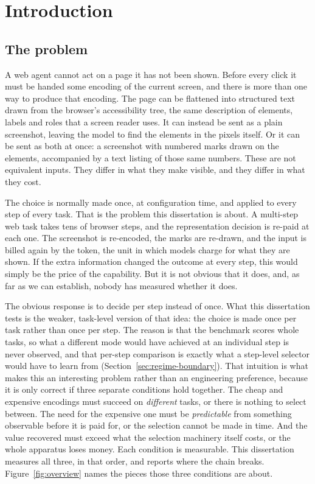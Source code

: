 \chapter{Introduction}
\label{ch:intro}

\section{The problem}
\label{sec:problem}

A web agent cannot act on a page it has not been shown. Before every click it
must be handed some encoding of the current screen, and there is more than one
way to produce that encoding. The page can be flattened into structured text
drawn from the browser's accessibility tree, the same description of elements,
labels and roles that a screen reader uses. It can instead be sent as a plain
screenshot, leaving the model to find the elements in the pixels itself. Or it
can be sent as both at once: a screenshot with numbered marks drawn on the
elements, accompanied by a text listing of those same numbers. These are
not equivalent inputs. They differ in what they make visible, and they differ in
what they cost.

The choice is normally made once, at configuration time, and applied to every
step of every task. That is the problem this dissertation is about. A
multi-step web task takes tens of browser steps, and the representation
decision is re-paid at each one. The screenshot is re-encoded, the marks are
re-drawn, and the input is billed again by the token, the unit in which
models charge for what they are shown. If the extra information changed the outcome at every
step, this would simply be the price of the capability. But it is not obvious
that it does, and, as far as we can establish, nobody has measured whether it does.

The obvious response is to decide per step instead of once. What this
dissertation tests is the weaker, task-level version of that idea: the choice
is made once per task rather than once per step. The reason is that the
benchmark scores whole tasks, so what a different mode would have achieved at
an individual step is never observed, and that per-step comparison is
exactly what a step-level selector would have to learn from
(Section~\ref{sec:regime-boundary}). That intuition is
what makes this an interesting problem rather than an engineering preference,
because it is only correct if three separate conditions hold together. The cheap and expensive encodings must succeed on \emph{different} tasks, or there is nothing to select between. The need for the expensive one
must be \emph{predictable} from something observable before it is paid for, or
the selection cannot be made in time. And the value recovered must exceed what
the selection machinery itself costs, or the whole apparatus loses money. Each
condition is measurable. This dissertation measures all three, in that order,
and reports where the chain breaks. Figure~\ref{fig:overview}
names the pieces those three conditions are about.

